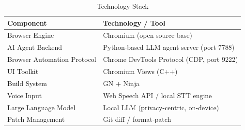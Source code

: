 \begin{table}[H]
\centering
\caption{Technology Stack}
\begin{tabular}{|p{5cm}|p{9cm}|}
\hline
\textbf{Component}            & \textbf{Technology / Tool} \\ \hline
Browser Engine                & Chromium (open-source base) \\ \hline
AI Agent Backend              & Python-based LLM agent server (port 7788) \\ \hline
Browser Automation Protocol   & Chrome DevTools Protocol (CDP, port 9222) \\ \hline
UI Toolkit                    & Chromium Views (C++) \\ \hline
Build System                  & GN + Ninja \\ \hline
Voice Input                   & Web Speech API / local STT engine \\ \hline
Large Language Model          & Local LLM (privacy-centric, on-device) \\ \hline
Patch Management              & Git diff / format-patch \\ \hline
\end{tabular}
\end{table}

